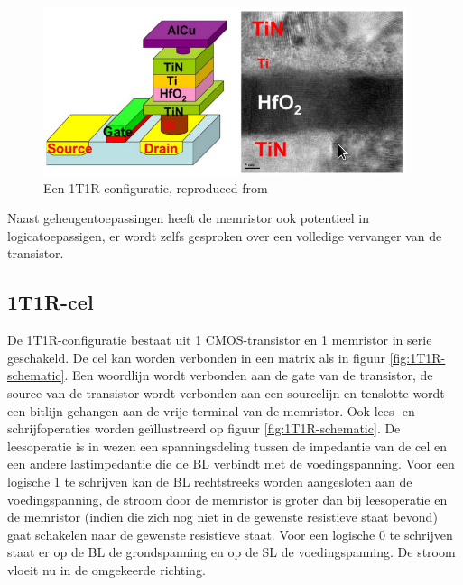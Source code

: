 \begin{figure}
  \centering
  \includegraphics[scale=0.6]{../fig/hfdstk-cel-1T1R.png}
  \caption[Een 1T1R-configuratie]{Een 1T1R-configuratie, reproduced from\cite{Won12}}
  \label{fig:1T1R}
\end{figure}

Naast geheugentoepassingen heeft de memristor ook potentieel in logicatoepassigen, er wordt zelfs gesproken over een volledige vervanger van de transistor\cite{Kue05}.

\subsection{1T1R-cel}
\label{1T1R}
De 1T1R-configuratie bestaat uit 1 CMOS-transistor en 1 memristor in serie geschakeld. De cel kan  worden verbonden in een matrix als in figuur \ref{fig:1T1R-schematic}. Een woordlijn wordt verbonden aan de gate van de transistor, de source van de transistor wordt verbonden aan een sourcelijn en tenslotte wordt een bitlijn gehangen aan de vrije terminal van de memristor. Ook lees- en schrijfoperaties worden geïllustreerd op figuur \ref{fig:1T1R-schematic}. De leesoperatie is in wezen een spanningsdeling tussen de impedantie van de cel en een andere lastimpedantie die de BL verbindt met de voedingspanning. Voor een logische 1 te schrijven kan de BL rechtstreeks worden aangesloten aan de voedingspanning, de stroom door de memristor is groter dan bij leesoperatie en de memristor (indien die zich nog niet in de gewenste resistieve staat bevond) gaat schakelen naar de gewenste resistieve staat. Voor een logische 0 te schrijven staat er op de BL de grondspanning en op de SL de voedingspanning. De stroom vloeit nu in de omgekeerde richting.

